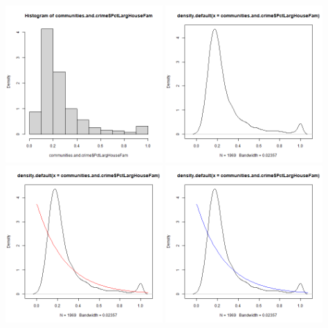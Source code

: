 \documentclass[12pt, letterpaper]{report}
\begin{document}
\centering
\includegraphics[width=0.45\textwidth]{exponential/PctLargHouseFam_hist}
\includegraphics[width=0.45\textwidth]{exponential/PctLargHouseFam_density}
\includegraphics[width=0.45\textwidth]{exponential/PctLargHouseFam_mle}
\includegraphics[width=0.45\textwidth]{exponential/PctLargHouseFam_mm}
\end{document}
